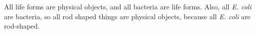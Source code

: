 {\begin{exercises}



\item All life forms are physical objects, and all bacteria are life forms. Also, all \textit{E. coli} are bacteria, so all rod shaped things are physical objects, because all \textit{E. coli} are rod-shaped. 
   
 





\end{exercises}}
